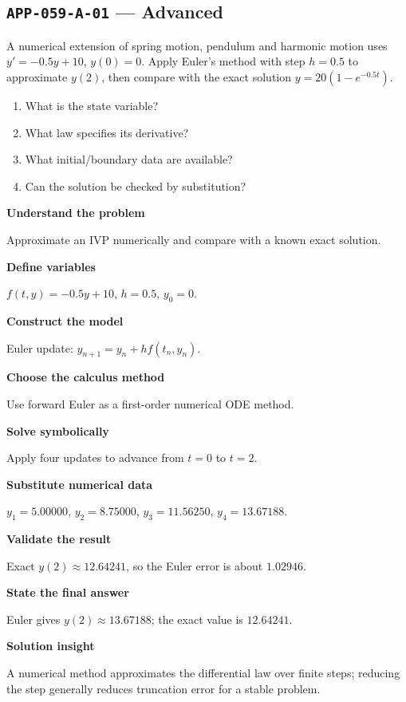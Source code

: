 \documentclass[11pt]{book}
\newcommand{\pid}[1]{\texttt{#1}}
\begin{document}
\subsection*{\pid{APP-059-A-01} — Advanced}
\begin{problembox}
A numerical extension of spring motion, pendulum and harmonic motion uses $y'=-0.5y+10$, $y(0)=0$. Apply Euler's method with step $h=0.5$ to approximate $y(2)$, then compare with the exact solution $y=20(1-e^{-0.5t})$.
\end{problembox}
\begin{promptbox}\begin{enumerate}
\item What is the state variable?
\item What law specifies its derivative?
\item What initial/boundary data are available?
\item Can the solution be checked by substitution?
\end{enumerate}\end{promptbox}
\begin{solutionbox}
\textbf{Understand the problem}\par Approximate an IVP numerically and compare with a known exact solution.\par\medskip
\textbf{Define variables}\par $f(t,y)=-0.5y+10$, $h=0.5$, $y_0=0$.\par\medskip
\textbf{Construct the model}\par Euler update: $y_{n+1}=y_n+h f(t_n,y_n)$.\par\medskip
\textbf{Choose the calculus method}\par Use forward Euler as a first-order numerical ODE method.\par\medskip
\textbf{Solve symbolically}\par Apply four updates to advance from $t=0$ to $t=2$.\par\medskip
\textbf{Substitute numerical data}\par $y_1=5.00000$, $y_2=8.75000$, $y_3=11.56250$, $y_4=13.67188$.\par\medskip
\textbf{Validate the result}\par Exact $y(2)\approx 12.64241$, so the Euler error is about $1.02946$.\par\medskip
\textbf{State the final answer}\par Euler gives $y(2)\approx 13.67188$; the exact value is $12.64241$.\par\medskip
\textbf{Solution insight}\par A numerical method approximates the differential law over finite steps; reducing the step generally reduces truncation error for a stable problem.\par\medskip
\end{solutionbox}
\end{document}
